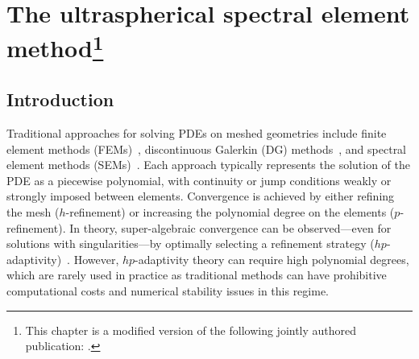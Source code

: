 \graphicspath{{chapters/\chap/figures/}}
\makeatletter
{}
\makeatother

\setcounter{savefootnote}{\value{footnote}} %
\renewcommand*{\thefootnote}{\fnsymbol{footnote}}

\chapter[The ultraspherical spectral element method]{The ultraspherical spectral element method\protect\footnote[2]{This chapter is a modified version of the following jointly authored publication: .}}\label{sec:\chap}

\renewcommand*{\thefootnote}{\arabic{footnote}}
\setcounter{footnote}{\value{savefootnote}} %

\section{Introduction}\label{sec:\chap:introduction}

Traditional approaches for solving PDEs on meshed geometries include finite element methods (FEMs)~\cite{Hughes_12_01}, discontinuous Galerkin (DG) methods~\cite{Cockburn_00_01}, and spectral element methods (SEMs)~\cite{Patera_84_01}. Each approach typically represents the solution of the PDE as a piecewise polynomial, with continuity or jump conditions weakly or strongly imposed between elements. Convergence is achieved by either refining the mesh ($h$-refinement) or increasing the polynomial degree on the elements ($p$-refinement). In theory, super-algebraic convergence can be observed---even for solutions with singularities---by optimally selecting a refinement strategy ($hp$-adaptivity)~\cite{Babuska_86_01}. However, $hp$-adaptivity theory can require high polynomial degrees, which are rarely used in practice as traditional methods can have prohibitive computational costs and numerical stability issues in this regime.

